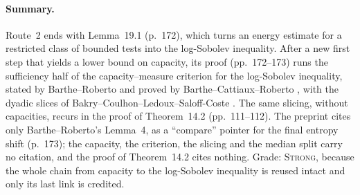 \documentclass[11pt]{article}
\newcommand{\ploc}[2]{#1}
\newcommand{\sloc}[2]{\cite[#2]{#1}}
\newcommand{\grade}[1]{\textsc{#1}}
\begin{document}
\paragraph{Summary.}
Route~2 ends with \ploc{Lemma~19.1}{cap-entropy.tex:44--143} (p.~172), which
turns an energy estimate for a restricted class of bounded tests into the
log-Sobolev inequality. After a new first step that yields a lower bound on
capacity, its proof (\ploc{pp.~172--173}{cap-entropy.tex:94--143}) runs the
sufficiency half of the capacity--measure criterion for the log-Sobolev
inequality, stated by Barthe--Roberto
\sloc{BartheRoberto2003-SobolevInequalitiesRealLine}{\S4, remark~6)} and proved by
Barthe--Cattiaux--Roberto
\sloc{BartheEtAl2004-InterpolatedInequalitiesOrliczIsoperimetry}{Thms~11
and~13}, with the dyadic slices of Bakry--Coulhon--Ledoux--Saloff-Coste
\sloc{BakryEtAl1995-SobolevInequalitiesInDisguise}{\S10.1}. The same slicing,
without capacities, recurs in \ploc{the proof of
Theorem~14.2}{profile-entropy.tex:614--677} (pp.~111--112). The preprint cites
only Barthe--Roberto's Lemma~4, as a ``compare'' pointer for the final entropy
shift (\ploc{p.~173}{cap-entropy.tex:124--125}); the capacity, the criterion,
the slicing and the median split carry no citation, and the proof of
Theorem~14.2 cites nothing. Grade: \grade{Strong}, because the whole chain from
capacity to the log-Sobolev inequality is reused intact and only its last link
is credited.
\end{document}
